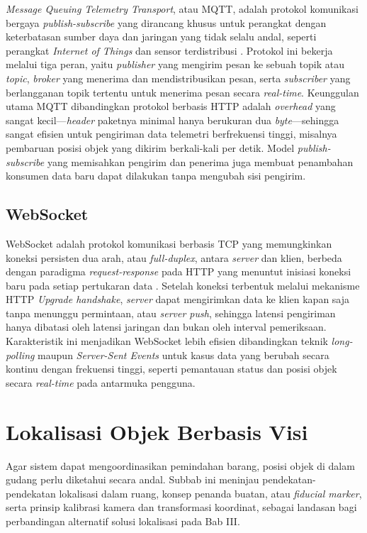 \textit{Message Queuing Telemetry Transport}, atau MQTT, adalah protokol komunikasi bergaya \textit{publish-subscribe} yang dirancang khusus untuk perangkat dengan keterbatasan sumber daya dan jaringan yang tidak selalu andal, seperti perangkat \textit{Internet of Things} dan sensor terdistribusi \autocite{oasis2014}. Protokol ini bekerja melalui tiga peran, yaitu \textit{publisher} yang mengirim pesan ke sebuah topik atau \textit{topic}, \textit{broker} yang menerima dan mendistribusikan pesan, serta \textit{subscriber} yang berlangganan topik tertentu untuk menerima pesan secara \textit{real-time}. Keunggulan utama MQTT dibandingkan protokol berbasis HTTP adalah \textit{overhead} yang sangat kecil---\textit{header} paketnya minimal hanya berukuran dua \textit{byte}---sehingga sangat efisien untuk pengiriman data telemetri berfrekuensi tinggi, misalnya pembaruan posisi objek yang dikirim berkali-kali per detik. Model \textit{publish-subscribe} yang memisahkan pengirim dan penerima juga membuat penambahan konsumen data baru dapat dilakukan tanpa mengubah sisi pengirim.

\subsection{WebSocket}

WebSocket adalah protokol komunikasi berbasis TCP yang memungkinkan koneksi persisten dua arah, atau \textit{full-duplex}, antara \textit{server} dan klien, berbeda dengan paradigma \textit{request-response} pada HTTP yang menuntut inisiasi koneksi baru pada setiap pertukaran data \autocite{fette2011}. Setelah koneksi terbentuk melalui mekanisme HTTP \textit{Upgrade handshake}, \textit{server} dapat mengirimkan data ke klien kapan saja tanpa menunggu permintaan, atau \textit{server push}, sehingga latensi pengiriman hanya dibatasi oleh latensi jaringan dan bukan oleh interval pemeriksaan. Karakteristik ini menjadikan WebSocket lebih efisien dibandingkan teknik \textit{long-polling} maupun \textit{Server-Sent Events} untuk kasus data yang berubah secara kontinu dengan frekuensi tinggi, seperti pemantauan status dan posisi objek secara \textit{real-time} pada antarmuka pengguna.

\section{Lokalisasi Objek Berbasis Visi}
\label{sec:lokalisasi-visi}

Agar sistem dapat mengoordinasikan pemindahan barang, posisi objek di dalam gudang perlu diketahui secara andal. Subbab ini meninjau pendekatan-pendekatan lokalisasi dalam ruang, konsep penanda buatan, atau \textit{fiducial marker}, serta prinsip kalibrasi kamera dan transformasi koordinat, sebagai landasan bagi perbandingan alternatif solusi lokalisasi pada Bab III.

